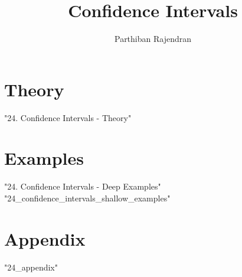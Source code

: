 \documentclass[float=false, crop=false,11pt,oneside]{book}
\author{Parthiban Rajendran}
\title{Confidence Intervals}
\begin{document}
    
    \maketitle 
    
    \tableofcontents
    
    
    \chapter{Theory}
    {"24. Confidence Intervals - Theory"} 
    
    \chapter{Examples}
    {"24. Confidence Intervals - Deep Examples"}
    {"24_confidence_intervals_shallow_examples"}  
    
    \chapter{Appendix}   
    {"24_appendix"}

	\nocite{*}
	 	
\end{document}

